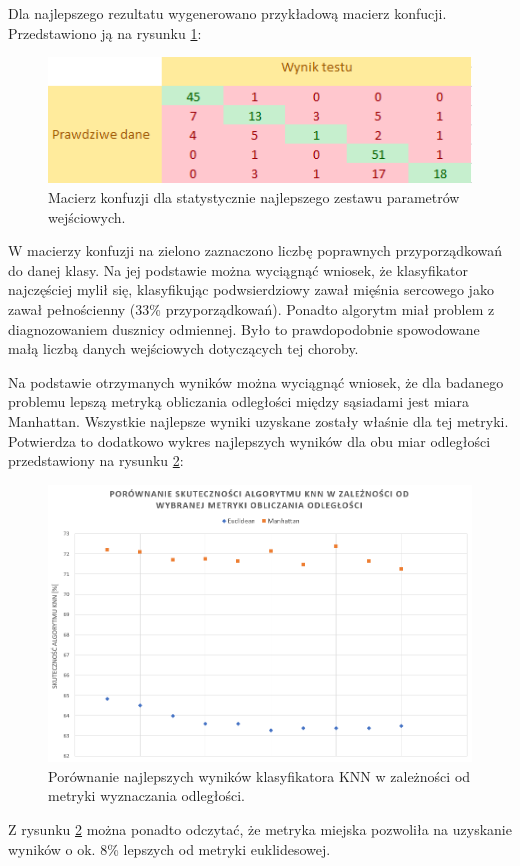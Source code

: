\documentclass{article}
\begin{document}
Dla najlepszego rezultatu wygenerowano przykładową macierz konfucji. Przedstawiono ją na rysunku \ref{fig:matrix}:

\begin{figure}[h]
    \centering
    \noindent 
    \vspace{.2cm}
    \includegraphics[width=12cm]{matrix.png}
    \caption{Macierz konfuzji dla statystycznie najlepszego zestawu parametrów wejściowych.}
    \label{fig:matrix}
\end{figure}

W macierzy konfuzji na zielono zaznaczono liczbę poprawnych przyporządkowań do danej klasy.
Na jej podstawie można wyciągnąć wniosek, że klasyfikator najczęściej mylił się, klasyfikując podwsierdziowy zawał mięśnia sercowego jako zawał pełnościenny (33\% przyporządkowań). Ponadto algorytm miał problem z diagnozowaniem dusznicy odmiennej. Było to prawdopodobnie spowodowane małą liczbą danych wejściowych dotyczących tej choroby.

\newpage

Na podstawie otrzymanych wyników można wyciągnąć wniosek, że dla badanego problemu lepszą metryką obliczania odległości między sąsiadami jest miara Manhattan. Wszystkie najlepsze wyniki uzyskane zostały właśnie dla tej metryki. Potwierdza to dodatkowo wykres najlepszych wyników dla obu miar odległości przedstawiony na rysunku \ref{fig:metryki}:

\begin{figure}[h]
    \centering
    \noindent 
    \vspace{.2cm}
    \includegraphics[width=16cm]{metryki.png}
    \caption{Porównanie najlepszych wyników klasyfikatora KNN w zależności od metryki wyznaczania odległości.}
    \label{fig:metryki}
\end{figure}
\noindent
Z rysunku \ref{fig:metryki} można ponadto odczytać, że metryka miejska pozwoliła na uzyskanie wyników o ok. 8\% lepszych od metryki euklidesowej.\\
\end{document}
